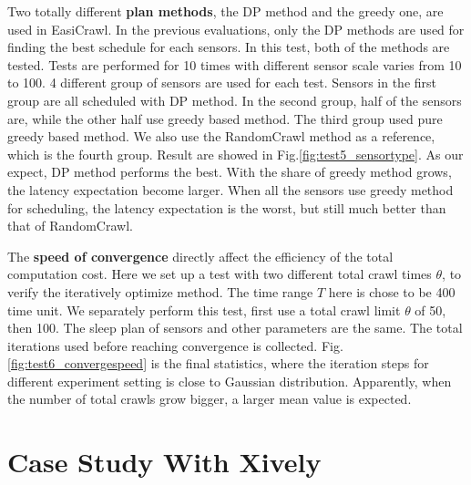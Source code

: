 \documentclass[conference]{IEEEtran}
\begin{document}
Two totally different \textbf{plan methods}, the DP method and the greedy one, are used in EasiCrawl.
In the previous evaluations, only the DP methods are used for finding the best schedule for each sensors. 
In this test, both of the methods are tested. 
Tests are performed for 10 times with different sensor scale varies from 10 to 100. 4 different group of sensors are used for each test. Sensors in the first group are all scheduled with DP method. In the second group, half of the sensors are, while the other half use greedy based method. The third group used pure greedy based method. We also use the RandomCrawl method as a reference, which is the fourth group.
Result are showed in Fig.\ref{fig:test5_sensortype}. As our expect, DP method performs the best. With the share of greedy method grows, the latency expectation become larger. When all the sensors use greedy method for scheduling, the latency expectation is the worst, but still much better than that of RandomCrawl.

The \textbf{speed of convergence} directly affect the efficiency of the total computation cost. Here we set up a test with two different total crawl times $\theta$, to verify the iteratively optimize method. The time range $T$ here is chose to be 400 time unit. We separately perform this test, first use a total crawl limit $\theta$ of 50, then 100. The sleep plan of sensors and other parameters are the same. The total iterations used before reaching convergence is collected.
Fig.\ref{fig:test6_convergespeed} is the final statistics, where the iteration steps for different experiment setting is close to Gaussian distribution. Apparently, when the number of total crawls grow bigger, a larger mean value is expected.

\section{Case Study With Xively} \label{case_study}
\end{document}
